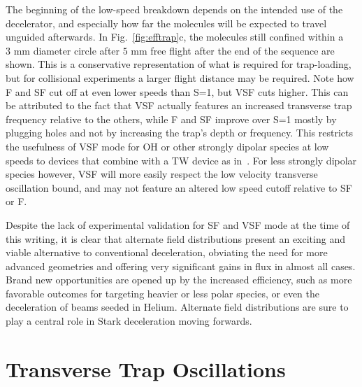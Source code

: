 The beginning of the low-speed breakdown depends on the intended use of the decelerator, and especially how far the molecules will be expected to travel unguided afterwards. 
In Fig.~\ref{fig:efftrap}c, the molecules still confined within a $3\text{ mm}$ diameter circle after $5\text{ mm}$ free flight after the end of the sequence are shown. 
This is a conservative representation of what is required for trap-loading, but for collisional experiments a larger flight distance may be required.
Note how F and SF cut off at even lower speeds than S=1, but VSF cuts higher. 
This can be attributed to the fact that VSF actually features an increased transverse trap frequency relative to the others, while F and SF improve over S=1 mostly by plugging holes and not by increasing the trap's depth or frequency.
This restricts the usefulness of VSF mode for OH or other strongly dipolar species at low speeds to devices that combine with a TW device as in~\cite{Quintero-Perez2013}.
For less strongly dipolar species however, VSF will more easily respect the low velocity transverse oscillation bound, and may not feature an altered low speed cutoff relative to SF or F.

Despite the lack of experimental validation for SF and VSF mode at the time of this writing, it is clear that alternate field distributions present an exciting and viable alternative to conventional deceleration, obviating the need for more advanced geometries and offering very significant gains in flux in almost all cases.
Brand new opportunities are opened up by the increased efficiency, such as more favorable outcomes for targeting heavier or less polar species, or even the deceleration of beams seeded in Helium.
Alternate field distributions are sure to play a central role in Stark deceleration moving forwards.

\section{Transverse Trap Oscillations}

